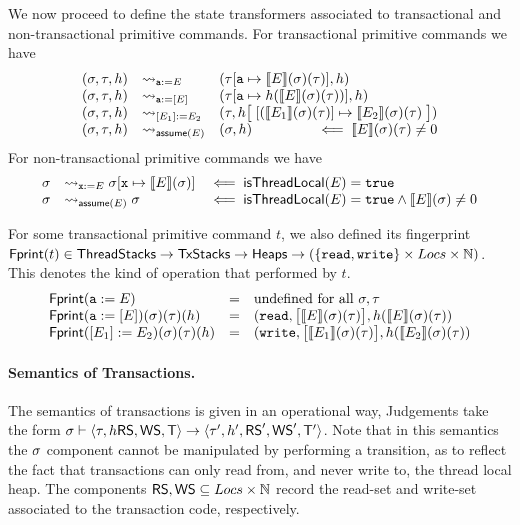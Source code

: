 \documentclass[a4paper,UKenglish]{article}%
\theoremstyle{plain}
\begin{document}
We now proceed to define the state transformers associated to transactional and non-transactional primitive commands. 
For transactional primitive commands we have  
\[
\begin{array}{lll}
(\thdstack, \txstack, \heap) &\rightsquigarrow_{\mathtt{a} := E}& (\txstack[\mathtt{a} \mapsto \interpr{E}(\thdstack)(\txstack)], \heap)\\
(\thdstack, \txstack, \heap) &\rightsquigarrow_{\mathtt{a} := [E]}& (\txstack[\mathtt{a} \mapsto \heap(\interpr{E}(\thdstack)(\txstack))], \heap)\\
(\thdstack, \txstack, \heap) &\rightsquigarrow_{[E_1] := E_2}& (\txstack, \heap\big[\; [(\interpr{E_1}(\thdstack)(\txstack)] \mapsto 
\interpr{E_2}(\thdstack)(\txstack) \;\big])\\
(\thdstack, \txstack, \heap) &\rightsquigarrow_{\assume(E)} & (\thdstack,\heap) \hfill \impliedby \interpr{E}(\thdstack)(\txstack) \neq 0
\end{array}
\]
For non-transactional primitive commands we have 
\[
\begin{array}{llll}
\sigma &\rightsquigarrow_{\mathtt{x} := E} \sigma[\mathtt{x} \mapsto {\llbracket E \rrbracket}(\sigma)] &\impliedby \mathsf{isThreadLocal}(E) = \mathtt{true}\\
\sigma &\rightsquigarrow_{\mathsf{assume}(E)} \sigma &\impliedby \mathsf{isThreadLocal}(E) = \mathtt{true} \wedge {\llbracket E \rrbracket}(\sigma) \neq 0
\end{array}
\]

For some transactional primitive command $t$, we also defined its fingerprint $\mathsf{Fprint}(t) \in 
\mathsf{ThreadStacks} \rightarrow \mathsf{TxStacks} \rightarrow \mathsf{Heaps} \rightarrow (\{{{\tt read}}, {{\tt write}}\} \times Locs \times \mathbb{N})$. 
This denotes the kind of operation that  performed by  $t$. 
\[
\begin{array}{lcl}
\mathsf{Fprint}(\mathtt{a} := E) &=& \text{undefined for all } \sigma,\tau\\
\mathsf{Fprint}(\mathtt{a} := [E])(\sigma)(\tau)(h) &=& ({{\tt read}}, \big[ {\llbracket E \rrbracket}(\sigma)(\tau) \big], h({\llbracket E \rrbracket}(\sigma)(\tau))\\
\mathsf{Fprint}([E_1] := E_2)(\sigma)(\tau)(h) &=& ({{\tt write}}, \big[ {\llbracket E_1 \rrbracket}(\sigma)(\tau) \big], h({\llbracket E_2 \rrbracket}(\sigma)(\tau))
\end{array}
\]

\paragraph{\textbf{Semantics of Transactions.}}
The semantics of transactions is given in an operational way, 
Judgements take the form $\sigma \vdash \langle \tau, h \mathsf{RS}, \mathsf{WS}, \mathsf{T} \rangle 
\rightarrow \langle \tau', h', \mathsf{RS}', \mathsf{WS}', \mathsf{T}' \rangle$. Note that in this semantics 
the $\sigma$ component cannot be manipulated by performing a transition, as to reflect 
the fact that transactions can only read from, and never write to, the thread local heap.
The components $\mathsf{RS}, \mathsf{WS} \subseteq Locs \times \mathbb{N}$ record the read-set and write-set associated to the transaction code, 
respectively.
\end{document}
